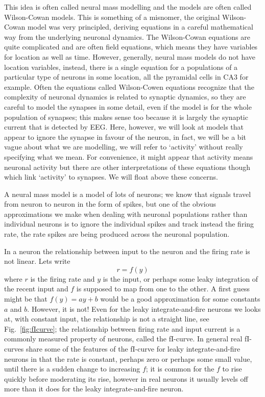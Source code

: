 \documentclass[11pt,a4paper]{scrartcl}
\begin{document}
This idea is often called neural mass modelling and the models are
often called Wilson-Cowan models. This is something of a misnomer, the
original Wilson-Cowan model was very principled, deriving equations in
a careful mathematical way from the underlying neuronal dynamics. The
Wilson-Cowan equations are quite complicated and are often field
equations, which means they have variables for location as well as
time. However, generally, neural mass models do not have location
variables, instead, there is a single equation for a populations of a
particular type of neurons in some location, all the pyramidal cells
in CA3 for example. Often the equations called Wilson-Cowen equations
recognize that the complexity of neuronal dynamics is related to
synaptic dynamics, so they are careful to model the synapses in some
detail, even if the model is for the whole population of synapses;
this makes sense too because it is largely the synaptic current that
is detected by EEG. Here, however, we will look at models that appear
to ignore the synapse in favour of the neuron, in fact, we will be a
bit vague about what we are modelling, we will refer to `activity'
without really specifying what we mean. For convenience, it might
appear that activity means neuronal activity but there are other
interpretations of these equations though which link `activity' to
synapses. We will float above these concerns.

A neural mass model is a model of lots of neurons; we know that
signals travel from neuron to neuron in the form of spikes, but one of
the obvious approximations we make when dealing with neuronal
populations rather than individual neurons is to ignore the individual
spikes and track instead the firing rate, the rate spikes are being
produced across the neuronal population. 

In a neuron the relationship between input to the neuron and the
firing rate is not linear. Lets write
\begin{equation}
  r=f(y)
\end{equation}
where $r$ is the firing rate and $y$ is the input, or perhaps some
leaky integration of the recent input and $f$ is supposed to map from
one to the other. A first guess might be that $f(y)=ay+b$ would be a
good approximation for some constants $a$ and $b$. However, it is not!
Even for the leaky integrate-and-fire neurons we looks at, with
constant input, the relationship is not a straight line, see
Fig.~\ref{fig:fIcurve}; the relationship between firing rate and input
current is a commonly measured property of neurons, called the
fI-curve. In general real fI-curves share some of the features of the
fI-curve for leaky integrate-and-fire neurons in that the rate is
constant, perhaps zero or perhaps some small value, until there is a
sudden change to increasing $f$; it is common for the $f$ to rise
quickly before moderating its rise, however in real neurons it usually
levels off more than it does for the leaky integrate-and-fire neuron.
\end{document}
